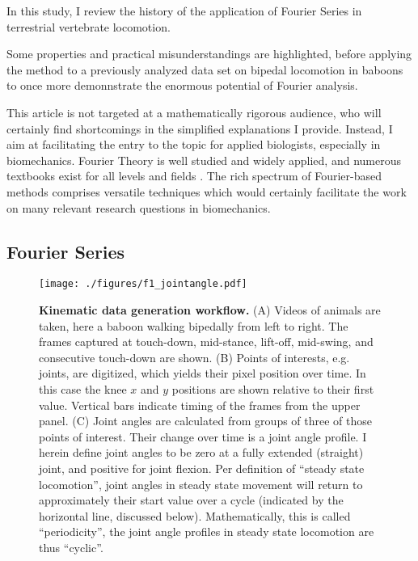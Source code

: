 In this study, I review the history of the application of Fourier Series in terrestrial vertebrate locomotion.

Some properties and practical misunderstandings are highlighted, before applying the method to a previously analyzed data set on bipedal locomotion in baboons \citep{Druelle2021} to once more demonnstrate the enormous potential of Fourier analysis.

This article is not targeted at a mathematically rigorous audience, who will certainly find shortcomings in the simplified explanations I provide.
Instead, I aim at facilitating the entry to the topic for applied biologists, especially in biomechanics.
Fourier Theory is well studied and widely applied, and numerous textbooks exist for all levels and fields \citep[\textit{cf.}][]{Bracewell2000,Osgood2019}.
The rich spectrum of Fourier-based methods comprises versatile techniques which would certainly facilitate the work on many relevant research questions in biomechanics.


\subsection{Fourier Series}
\label{sec:org6a84974}

\begin{figure}[pt]
\centering
\texttt{[image: ./figures/f1\_jointangle.pdf]}
\caption{\label{fig:jointangle}\textbf{Kinematic data generation workflow.} (A) Videos of animals are taken, here a baboon walking bipedally from left to right. The frames captured at touch-down, mid-stance, lift-off, mid-swing, and consecutive touch-down are shown. (B) Points of interests, e.g. joints, are digitized, which yields their pixel position over time. In this case the knee \(x\) and \(y\) positions are shown relative to their first value. Vertical bars indicate timing of the frames from the upper panel. (C) Joint angles are calculated from groups of three of those points of interest. Their change over time is a joint angle profile. I herein define joint angles to be zero at a fully extended (straight) joint, and positive for joint flexion. Per definition of ``steady state locomotion'', joint angles in steady state movement will return to approximately their start value over a cycle (indicated by the horizontal line, discussed below). Mathematically, this is called ``periodicity'', the joint angle profiles in steady state locomotion are thus ``cyclic''.}
\end{figure}

